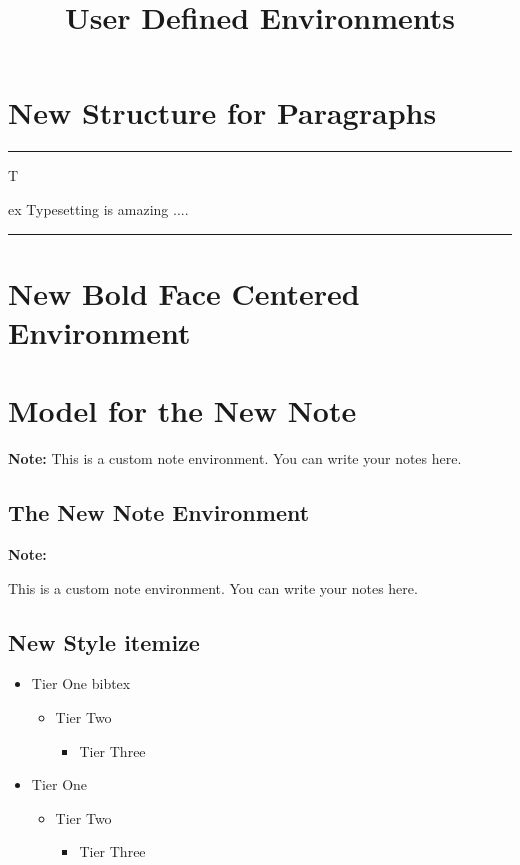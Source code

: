 \documentclass{article}
\title{\huge\bf User Defined Environments}
\date{}
\newenvironment{mypar}{
	\vspace{0.5cm}
	\noindent \textcolor{gray}{\rule{\textwidth}{3pt}}
	\vspace{1cm}
	
	{\Huge \textsc{T}}
	\Large \hspace{-0.7cm}
}{
	\vspace{1cm}
	\noindent \rule{\textwidth}{3pt} %
	\vspace{1cm}
}
\newenvironment{bfCenter}{
	\begin{center}
	\bfseries
}{
	\end{center}
}
\newenvironment{CNote}{
	\begin{center}
	\begin{minipage}{0.8\textwidth}
	\centering 
	\textbf{Note:} \hspace{-0.3cm}
}{
	\end{minipage}
	\end{center}
}
\newenvironment{items}{
	\begin{itemize}
	\bfseries
	\renewcommand{\labelitemi}{\textcircled{a}}
	\renewcommand{\labelitemii}{\dag}
	\renewcommand{\labelitemiii}{\textgreater}
	\providecommand{\bibtex}{bibtex}
}{
	\end{itemize}
}
\begin{document}
	\maketitle
	
	\section{New Structure for Paragraphs}
	\begin{mypar}
		ex Typesetting is amazing .... \kant[1]
	\end{mypar}
	
	\section{New Bold Face Centered Environment}
	\begin{bfCenter}
		\kant[1]
	\end{bfCenter}
	
	\section{Model for the New Note}
	\begin{center}
		\begin{minipage}{0.8\textwidth}
			\centering 
			\textbf{Note:} This is a custom note 						environment. You can write your notes here.
		\end{minipage}
	\end{center}
	
	\subsection{The New Note Environment}
	\begin{CNote}
		This is a custom note environment. You can write 		your notes here.
	\end{CNote}
	
	\subsection{New Style itemize}
	\begin{items}
		\item Tier One \bibtex
		\begin{items}
			\item Tier Two
			\begin{items}
				\item Tier Three
			\end{items}
		\end{items}
	\end{items}
	\begin{itemize}
	\item Tier One
		\begin{itemize}
		\item Tier Two
			\begin{itemize}
			\item Tier Three
			\end{itemize}
		\end{itemize}
	\end{itemize}
	
\end{document}
